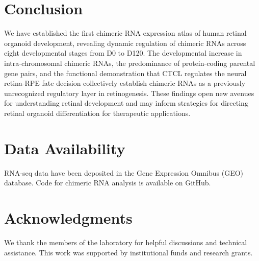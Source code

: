 \documentclass[12pt]{article}
\begin{document}
\section{Conclusion}

We have established the first chimeric RNA expression atlas of human retinal organoid development, revealing dynamic regulation of chimeric RNAs across eight developmental stages from D0 to D120. The developmental increase in intra-chromosomal chimeric RNAs, the predominance of protein-coding parental gene pairs, and the functional demonstration that CTCL regulates the neural retina-RPE fate decision collectively establish chimeric RNAs as a previously unrecognized regulatory layer in retinogenesis. These findings open new avenues for understanding retinal development and may inform strategies for directing retinal organoid differentiation for therapeutic applications.

\section*{Data Availability}

RNA-seq data have been deposited in the Gene Expression Omnibus (GEO) database. Code for chimeric RNA analysis is available on GitHub.

\section*{Acknowledgments}

We thank the members of the laboratory for helpful discussions and technical assistance. This work was supported by institutional funds and research grants.



\end{document}
